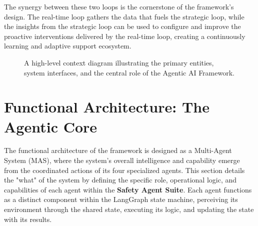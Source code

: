 The synergy between these two loops is the cornerstone of the framework's design. The real-time loop gathers the data that fuels the strategic loop, while the insights from the strategic loop can be used to configure and improve the proactive interventions delivered by the real-time loop, creating a continuously learning and adaptive support ecosystem.

\begin{figure}[h]
    \centering
    \caption{A high-level context diagram illustrating the primary entities, system interfaces, and the central role of the Agentic AI Framework.}
    \label{fig:context_diagram}
\end{figure}


\section{Functional Architecture: The Agentic Core}

The functional architecture of the framework is designed as a Multi-Agent System (MAS), where the system's overall intelligence and capability emerge from the coordinated actions of its four specialized agents. This section details the "what" of the system by defining the specific role, operational logic, and capabilities of each agent within the \textbf{Safety Agent Suite}. Each agent functions as a distinct component within the LangGraph state machine, perceiving its environment through the shared state, executing its logic, and updating the state with its results.

